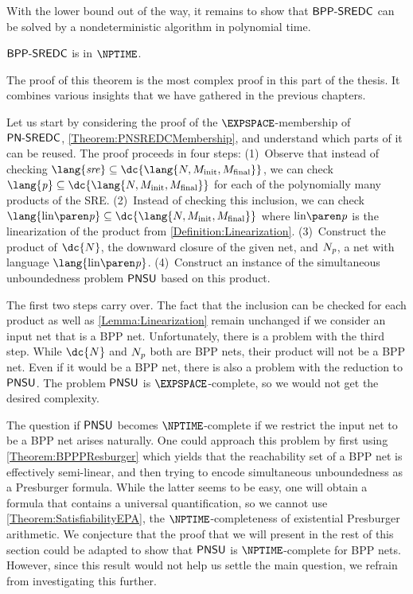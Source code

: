 \documentclass[../../diss.tex]{subfiles}
\begin{document}
With the lower bound out of the way, it remains to show that $\mathsf{BPP\text{-}SREDC}$ can be solved by a nondeterministic algorithm in polynomial time.

\begin{theorem}%
\label{Theorem:SREBPPDCMembership}%
    $\mathsf{BPP\text{-}SREDC}$ is in $\NPTIME$.
\end{theorem}

The proof of this theorem is the most complex proof in this part of the thesis.
It combines various insights that we have gathered in the previous chapters.

Let us start by considering the proof of the $\EXPSPACE$-membership of $\mathsf{PN\text{-}SREDC}$, \cref{Theorem:PNSREDCMembership}, and understand which parts of it can be reused.
The proof proceeds in four steps:
(1)~Observe that instead of checking $\lang{\sre} \subseteq \dc{\lang{N,\Minit,\Mfinal}}$, we can check $\lang{\product} \subseteq \dc{\lang{N,\Minit,\Mfinal}}$ for each of the polynomially many products of the SRE.\@
(2)~Instead of checking this inclusion, we can check $\lang{\linof{\product}} \subseteq \dc{\lang{N,\Minit,\Mfinal}}$ where $\linof{\product}$ is the linearization of the product from \cref{Definition:Linearization}.
(3)~Construct the product of $\dc{N}$, the downward closure of the given net, and $N_{\mathit{p}}$, a net with language $\lang{\linof{\product}}$.
(4)~Construct an instance of the simultaneous unboundedness problem $\mathsf{PNSU}$ based on this product.

The first two steps carry over.
The fact that the inclusion can be checked for each product as well as \cref{Lemma:Linearization} remain unchanged if we consider an input net that is a BPP net.
Unfortunately, there is a problem with the third step.
While $\dc{N}$ and $N_{\mathit{p}}$ both are BPP nets, their product will not be a BPP net.
Even if it would be a BPP net, there is also a problem with the reduction to $\mathsf{PNSU}$. The problem $\mathsf{PNSU}$ is $\EXPSPACE$-complete, so we would not get the desired complexity.

The question if $\mathsf{PNSU}$ becomes $\NPTIME$-complete if we restrict the input net to be a BPP net arises naturally.
One could approach this problem by first using \cref{Theorem:BPPPResburger} which yields that the reachability set of a BPP net is effectively semi-linear, and then trying to encode simultaneous unboundedness as a Presburger formula.
While the latter seems to be easy, one will obtain a formula that contains a universal quantification, so we cannot use \cref{Theorem:SatisfiabilityEPA}, the $\NPTIME$-completeness of existential Presburger arithmetic.
We conjecture that the proof that we will present in the rest of this section could be adapted to show that $\mathsf{PNSU}$ is $\NPTIME$-complete for BPP nets.
However, since this result would not help us settle the main question, we refrain from investigating this further.
\end{document}
